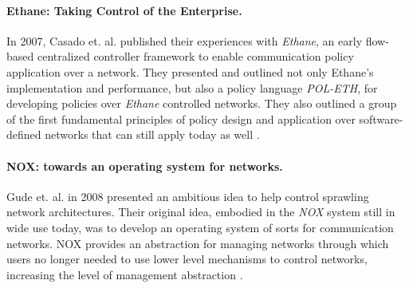 \paragraph{Ethane: Taking Control of the Enterprise.} In 2007, Casado et. al. published their experiences with {\sl Ethane}, an early flow-based centralized controller framework to enable communication policy application over a network.  They presented and outlined not only Ethane's implementation and performance, but also a policy language {\sl POL-ETH}, for developing policies over {\sl Ethane} controlled networks.  They also outlined a group of the first fundamental principles of policy design and application over software-defined networks that can still apply today as well \cite{CaFrPeLu:07}.

\paragraph{NOX: towards an operating system for networks.}  Gude et. al. in 2008 presented an ambitious idea to help control sprawling network architectures.  Their original idea, embodied in the {\sl NOX} system still in wide use today, was to develop an operating system of sorts for communication networks.  NOX provides an abstraction for managing networks through which users no longer needed to use lower level mechanisms to control networks, increasing the level of management abstraction \cite{GuKoPePf:08}.